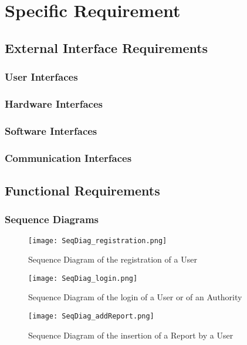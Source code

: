 \section{Specific Requirement}

\subsection{External Interface Requirements}

\subsubsection{User Interfaces}

\subsubsection{Hardware Interfaces}

\subsubsection{Software Interfaces}

\subsubsection{Communication Interfaces}

\subsection{Functional Requirements}

    \subsubsection{Sequence Diagrams}
    
    \begin{figure}[h]
        \centering
        \texttt{[image: SeqDiag\_registration.png]}
        \caption{Sequence Diagram of the registration of a User}
    \end{figure}
    
    \begin{figure}[h]
        \centering
        \texttt{[image: SeqDiag\_login.png]}
        \caption{Sequence Diagram of the login of a User or of an Authority}
    \end{figure}
    
    \begin{figure}[h]
        \centering
        \texttt{[image: SeqDiag\_addReport.png]}
        \caption{Sequence Diagram of the insertion of a Report by a User}
    \end{figure}
    
